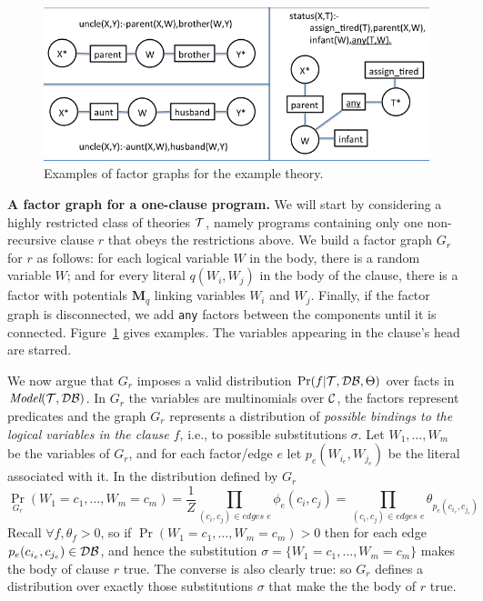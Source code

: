 \documentclass{article}
\newcommand{\cd}[1]{{\small \texttt{#1}}}
\newcommand{\mysubsection}[1]{\textbf{{#1}.}}
\newcommand{\M}{\textbf{M}}
\newcommand{\model}{\textit{Model}}
\newcommand{\C}{{\cal{C}}}
\newcommand{\T}{{\cal{T}}}
\newcommand{\DB}{{\cal{DB}}}
\begin{document}
\begin{figure}
\centerline{\includegraphics[width=0.8\linewidth]{./factor-graphs.png}}
\caption{\small Examples of factor graphs for the example
  theory.} \label{fig:factors}
\end{figure}

\mysubsection{A factor graph for a one-clause program} We will start
by considering a highly restricted class of theories $\T$, namely
programs containing only one non-recursive clause $r$ that obeys the
restrictions above.  We build a factor graph $G_r$ for $r$ as follows:
for each logical variable $W$ in the body, there is a random variable
$W$; and for every literal $q(W_i,W_j)$ in the body of the clause,
there is a factor with potentials $\M_q$ linking variables $W_i$ and
$W_j$.  Finally, if the factor graph is disconnected, we add \cd{any}
factors between the components until it is connected.
Figure~\ref{fig:factors} gives examples.  The variables appearing in
the clause's head are starred.

We now argue that $G_r$ imposes a valid distribution
$\Pr(f|\T,\DB,\Theta)$ over facts in $\model(\T,\DB)$.  In $G_r$ the
variables are multinomials over $\C$, the factors represent predicates
and the graph $G_r$ represents a distribution of \emph{possible
  bindings to the logical variables in the clause $f$}, i.e., to
possible substitutions $\sigma$. Let $W_1,\ldots,W_m$ be the variables
of $G_r$, and for each factor/edge $e$ let $p_e(W_{i_e},W_{j_e})$ be
the literal associated with it. In the distribution defined by $G_r$
\[
 \Pr_{G_r}(W_1=c_1,\ldots,W_m=c_m) = \frac{1}{Z}
 \prod_{(c_i,c_j)\in\textit{edges $e$}} \phi_e(c_i,c_j) =
 \prod_{(c_i,c_j)\in\textit{edges $e$}} \theta_{p_e(c_{i_e},c_{j_e})}
\]
Recall $\forall f,\theta_f>0$, so if $\Pr(W_1=c_1,\ldots,W_m=c_m)>0$
then for each edge $p_e(c_{i_e},c_{j_e}) \in \DB$, and hence the
substitution $\sigma=\{W_1=c_1,\ldots,W_m=c_m\}$ makes the body of
clause $r$ true.  The converse is also clearly true: so $G_r$ defines
a distribution over exactly those substitutions $\sigma$ that make the
the body of $r$ true.  
\end{document}
